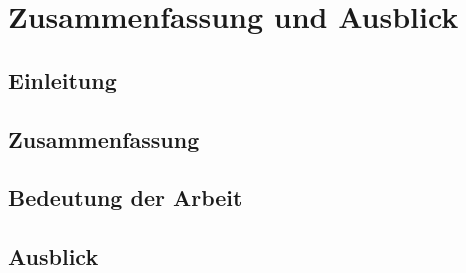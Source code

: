 \section{Zusammenfassung und Ausblick}
\subsection{Einleitung}

\subsection{Zusammenfassung}

\subsection{Bedeutung der Arbeit}

\subsection{Ausblick}

